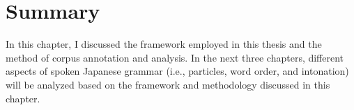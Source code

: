 




%


\section{Summary}

In this chapter,
I discussed
the framework employed in this thesis and
the method of corpus annotation and analysis.
In the next three chapters,
different aspects of spoken Japanese grammar (i.e., particles, word order, and intonation) will be analyzed based on the framework and methodology discussed in this chapter.








